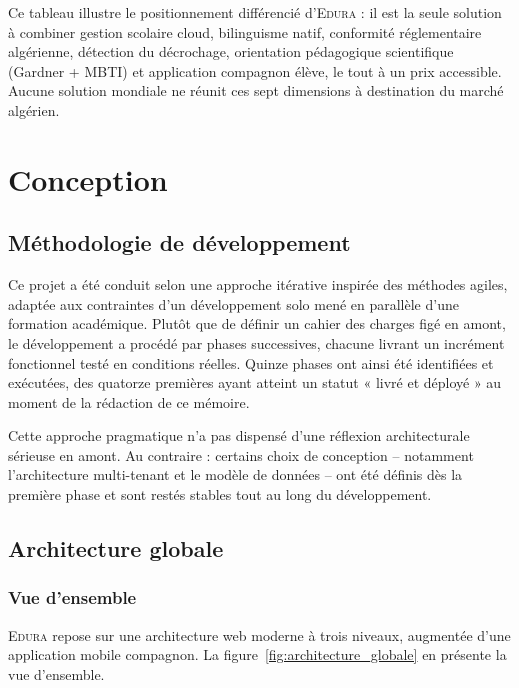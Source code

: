 \documentclass[12pt,a4paper,oneside]{report}
\newcommand{\edura}{\textsc{Edura}}
\begin{document}
Ce tableau illustre le positionnement différencié d'\edura{} : il est la seule solution à combiner gestion scolaire cloud, bilinguisme natif, conformité réglementaire algérienne, détection du décrochage, orientation pédagogique scientifique (Gardner + MBTI) et application compagnon élève, le tout à un prix accessible. Aucune solution mondiale ne réunit ces sept dimensions à destination du marché algérien.


\chapter{Conception}

\section{Méthodologie de développement}

Ce projet a été conduit selon une approche itérative inspirée des méthodes agiles, adaptée aux contraintes d'un développement solo mené en parallèle d'une formation académique. Plutôt que de définir un cahier des charges figé en amont, le développement a procédé par phases successives, chacune livrant un incrément fonctionnel testé en conditions réelles. Quinze phases ont ainsi été identifiées et exécutées, des quatorze premières ayant atteint un statut « livré et déployé » au moment de la rédaction de ce mémoire.

Cette approche pragmatique n'a pas dispensé d'une réflexion architecturale sérieuse en amont. Au contraire : certains choix de conception -- notamment l'architecture multi-tenant et le modèle de données -- ont été définis dès la première phase et sont restés stables tout au long du développement.

\section{Architecture globale}

\subsection{Vue d'ensemble}

\edura{} repose sur une architecture web moderne à trois niveaux, augmentée d'une application mobile compagnon. La figure~\ref{fig:architecture_globale} en présente la vue d'ensemble.
\end{document}
